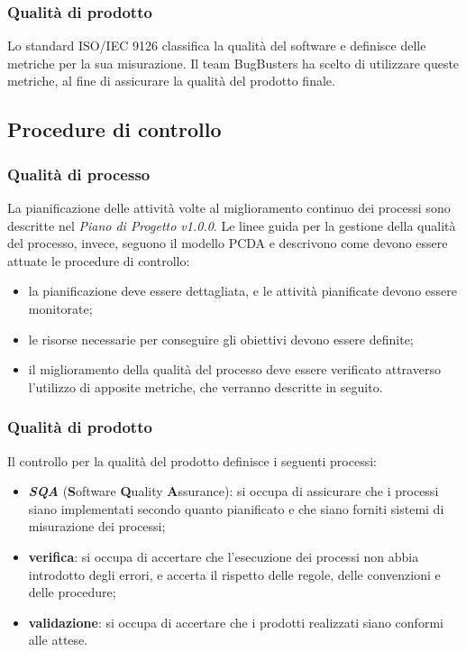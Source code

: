 \subsubsection{Qualit\`a di prodotto}
Lo standard ISO/IEC 9126 classifica la qualit\`a del software e definisce delle metriche per la sua misurazione. Il team BugBusters ha scelto di utilizzare queste metriche, al fine di assicurare la qualit\`a del prodotto finale.

\subsection{Procedure di controllo}
\subsubsection{Qualit\`a di processo}
La pianificazione delle attivit\`a volte al miglioramento continuo dei processi sono descritte nel \textit{Piano di Progetto v1.0.0}. Le linee guida per la gestione della qualit\`a del processo, invece, seguono il modello PCDA e descrivono come devono essere attuate le procedure di controllo:
\begin{itemize}
	\item la pianificazione deve essere dettagliata, e le attivit\`a pianificate devono essere monitorate;
	\item le risorse necessarie per conseguire gli obiettivi devono essere definite;
	\item il miglioramento della qualit\`a del processo deve essere verificato attraverso l'utilizzo di apposite metriche, che verranno descritte in seguito.
\end{itemize}

\subsubsection{Qualit\`a di prodotto}
Il controllo per la qualit\`a del prodotto definisce i seguenti processi:
\begin{itemize}
	\item \textit{\textbf{SQA}} (\textbf{S}oftware \textbf{Q}uality \textbf{A}ssurance): si occupa di assicurare che i processi siano implementati secondo quanto pianificato e che siano forniti sistemi di misurazione dei processi;
	\item \textbf{verifica}: si occupa di accertare che l'esecuzione dei processi non abbia introdotto degli errori, e accerta il rispetto delle regole, delle convenzioni e delle procedure;
	\item \textbf{validazione}: si occupa di accertare che i prodotti realizzati siano conformi alle attese.
\end{itemize}

